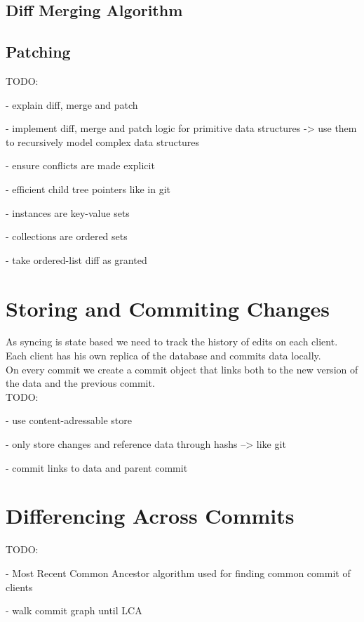 \subsection{Diff Merging Algorithm}

\subsection{Patching}

TODO:

- explain diff, merge and patch

- implement diff, merge and patch logic for primitive data structures
  -> use them to recursively model complex data structures

- ensure conflicts are made explicit

- efficient child tree pointers like in git

- instances are key-value sets

- collections are ordered sets

- take ordered-list diff as granted

\section{Storing and Commiting Changes}
\label{main.committing}
As syncing is state based we need to track the history of edits on each client.\\Each client has his own replica of the database and commits
data locally.\\On every commit we create a commit object that links both
to the new version of the data and the previous commit.\\

TODO:

- use content-adressable store

- only store changes and reference  data through hashs --> like git

- commit links to data and parent commit

\section{Differencing Across Commits}
\label{main.diff-across-commits}

TODO:

- Most Recent Common Ancestor algorithm used for finding common commit of clients

- walk commit graph until LCA

